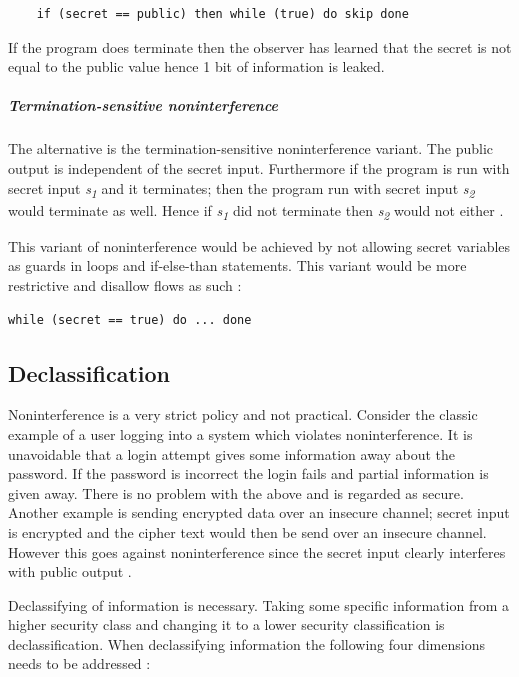 \begin{lstlisting}
	if (secret == public) then while (true) do skip done
\end{lstlisting}

If the program does terminate then the observer has learned that the secret is not equal to the public value hence 1 bit of information is leaked. 


\subparagraph{Termination-sensitive noninterference}
The alternative is the termination-sensitive noninterference variant. The public output is independent of the secret input. Furthermore if the program is run with secret input \emph{s\textsubscript{1}} and it terminates; then the program run with secret input \emph{s\textsubscript{2}} would terminate as well. Hence if \emph{s\textsubscript{1}} did not terminate then \emph{s\textsubscript{2}} would not either \cite{Hedin2011}.


This variant of noninterference would be achieved by not allowing secret variables as guards in loops and if-else-than statements. This variant would be more restrictive and disallow flows as such \cite{Hedin2011}:

\begin{lstlisting}
while (secret == true) do ... done
\end{lstlisting}

\subsection{Declassification}
Noninterference is a very strict policy and not practical. Consider the classic example of a user logging into a system which violates noninterference. It is unavoidable that a login attempt gives some information away about the password. If the password is incorrect the login fails and partial information is given away. There is no problem with the above and is regarded as secure. Another example is sending encrypted data over an insecure channel; secret input is encrypted and the cipher text would then be send over an insecure channel. However this goes against noninterference since the secret input clearly interferes with public output \cite{Hedin2011}.

Declassifying of information is necessary. Taking some specific information from a higher security class and changing it to a lower security classification is declassification. When declassifying information the following four dimensions needs to be addressed \cite{Sabelfeld2009}:

